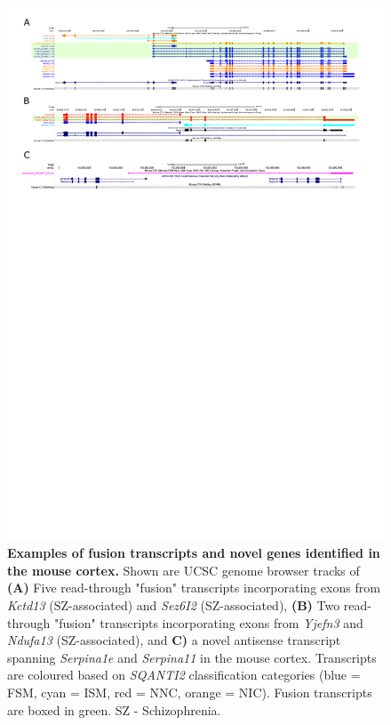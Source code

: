 \begin{landscape}
	\begin{figure}[htp]
		\begin{center}
			\includegraphics[page=1,trim={0 20cm 0 0},scale = 1.2]{Figures/FusionNovelGenes.pdf}
		\end{center}
		\vspace{1cm}
		\captionsetup{width=1.5\textwidth}
		\caption[Examples of fusion transcripts and novel genes identified in the mouse cortex]%
		{\textbf{Examples of fusion transcripts and novel genes identified in the mouse cortex.} Shown are UCSC genome browser tracks of \textbf{(A)} Five read-through "fusion" transcripts incorporating exons from \textit{Kctd13} (SZ-associated) and \textit{Sez6I2} (SZ-associated), \textbf{(B)} Two read-through "fusion" transcripts incorporating exons from \textit{Yjefn3} and \textit{Ndufa13} (SZ-associated), and \textbf{C)} a novel antisense transcript spanning \textit{Serpina1e} and \textit{Serpina11} in the mouse cortex. Transcripts are coloured based on \textit{SQANTI2} classification categories (blue = FSM, cyan = ISM, red = NNC, orange = NIC). Fusion transcripts are boxed in green. SZ - Schizophrenia.}   
		\label{fig:isoseq_whole_novelfusion}
	\end{figure}
\end{landscape}



